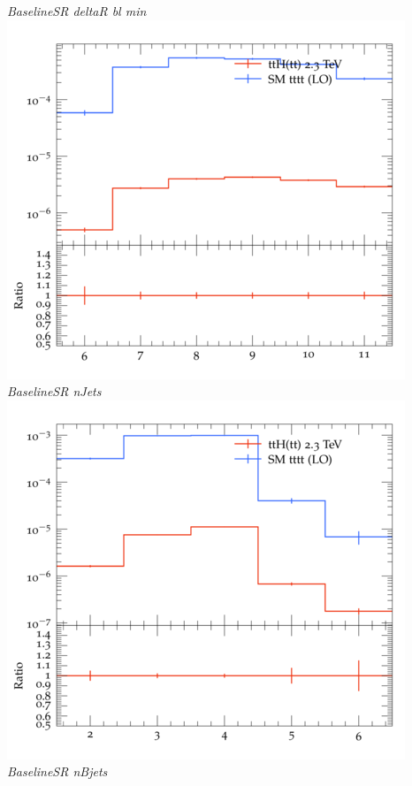 \documentclass{beamer}
\begin{document}
\begin{frame}
\begin{columns}
\textit{\small BaselineSR deltaR bl min}
\includegraphics[width=\textwidth]{../plots/ttH_2300/tttt_ttH_1LOS/BaselineSR_nJets.png}\\
\textit{\small BaselineSR nJets}
\includegraphics[width=\textwidth]{../plots/ttH_2300/tttt_ttH_1LOS/BaselineSR_nBjets.png}\\
\textit{\small BaselineSR nBjets}
\end{columns}
\end{frame}
\end{document}
